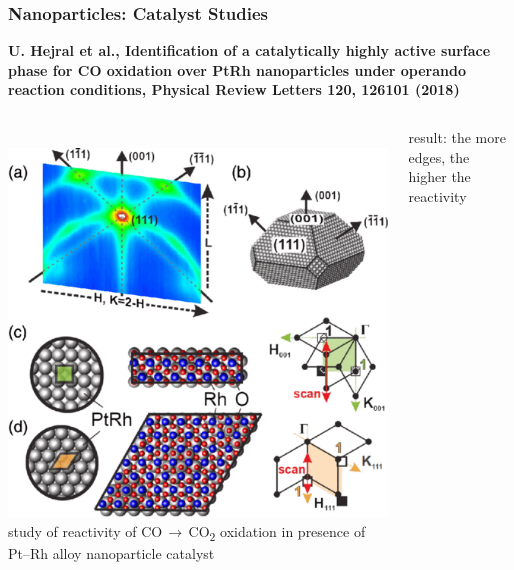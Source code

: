 \documentclass[10pt,t]{beamer}
\begin{document}
\begin{frame}
\begin{columns}
\end{columns}
\vspace*{-7pt}
\end{frame}


\begin{frame}
\frametitle{Nanoparticles: Catalyst Studies}
\vspace*{-2.6\baselineskip}
\alert{\bfseries\footnotesize U. Hejral et al., Identification of a catalytically highly active surface phase for CO oxidation over PtRh nanoparticles under operando reaction conditions, Physical Review Letters 120, 126101 (2018)}
\vspace*{\baselineskip}
\begin{columns}
~\\[-\baselineskip]
    \includegraphics[width=\textwidth]{nano-methode}
study of reactivity of CO\,$\rightarrow$\,CO\textsubscript{2} oxidation in presence of Pt--Rh alloy nanoparticle catalyst
    \vspace*{1ex}
    
    result: the more edges, the higher the reactivity
    \vspace*{1ex}


\end{columns}
\end{frame}
\end{document}
